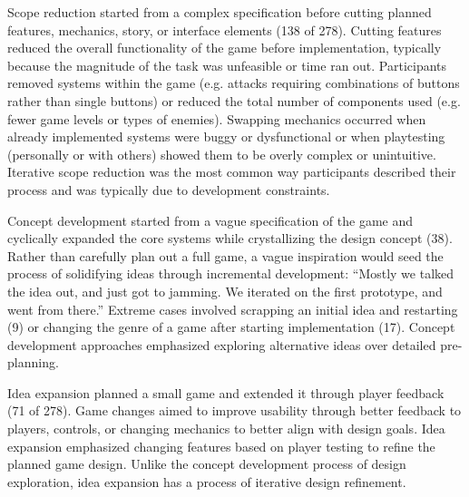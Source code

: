 \documentclass{sig-alternate}
\begin{document}
Scope reduction started from a complex specification before cutting planned features, mechanics, story, or interface elements (138 of 278).
Cutting features reduced the overall functionality of the game before implementation, typically because the magnitude of the task was unfeasible or time ran out. Participants removed systems within the game (e.g. attacks requiring combinations of buttons rather than single buttons) or reduced the total number of components used (e.g. fewer game levels or types of enemies).
Swapping mechanics occurred when already implemented systems were buggy or dysfunctional or when playtesting (personally or with others) showed them to be overly complex or unintuitive. 
Iterative scope reduction was the most common way participants described their process and was typically due to development constraints.

Concept development started from a vague specification of the game and cyclically expanded the core systems while crystallizing the design concept (38).
Rather than carefully plan out a full game, a vague inspiration would seed the process of solidifying ideas through incremental development: 
``Mostly we talked the idea out, and just got to jamming. We iterated on the first prototype, and went from there.''
Extreme cases involved scrapping an initial idea and restarting (9) or changing the genre of a game after starting implementation (17). Concept development approaches emphasized exploring alternative ideas over detailed pre-planning.

Idea expansion planned a small game and extended it through player feedback (71 of 278). Game changes aimed to improve usability through better feedback to players, controls, or changing mechanics to better align with design goals.
Idea expansion emphasized changing features based on player testing to refine the planned game design. 
Unlike the concept development process of design exploration, idea expansion has a process of iterative design refinement.
\end{document}
